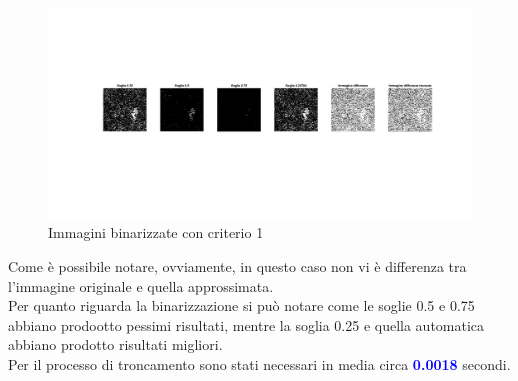 \begin{figure}[H]
    \centering
     \includegraphics[width=\textwidth]{images/Criterio1.jpg}
    \caption{Immagini binarizzate con criterio 1}
\end{figure}

\noindent Come è possibile notare, ovviamente, in questo caso non vi è differenza tra l'immagine originale e quella approssimata.\\
Per quanto riguarda la binarizzazione si può notare come le soglie 0.5 e 0.75 abbiano prodootto pessimi risultati, mentre la soglia 0.25 e quella automatica abbiano prodotto risultati migliori.\\
\noindent Per il processo di troncamento sono stati necessari in media circa \textcolor{blue}{\textbf{0.0018}} secondi.\\




